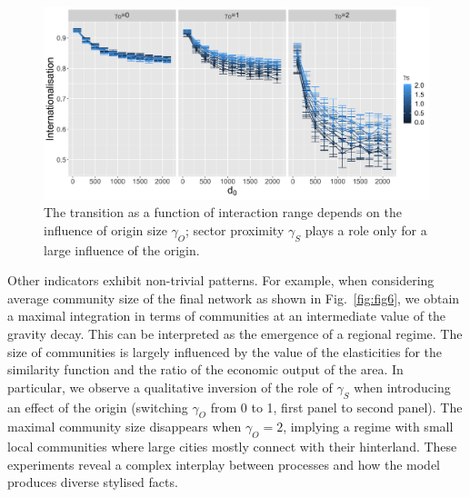 \documentclass[10pt,letterpaper]{article}
\providecommand{\DIFaddbeginFL}{} %
\providecommand{\DIFaddendFL}{} %
\begin{document}
\begin{figure}
    \DIFaddbeginFL \includegraphics[width=\linewidth]{figures/Fig5.png}
    \DIFaddendFL \vspace{2cm}
    \caption{The transition as a function of interaction range depends on the influence of origin size $\gamma_O$; sector proximity $\gamma_S$ plays a role only for a large influence of the origin.\label{fig:fig5}}
\end{figure}


Other indicators exhibit non-trivial patterns. For example, when considering average community size of the final network as shown in Fig.~\ref{fig:fig6}, we obtain a maximal integration in terms of communities at an intermediate value of the gravity decay. This can be interpreted as the emergence of a regional regime. The size of communities is largely influenced by the value of the elasticities for the similarity function and the ratio of the economic output of the area. In particular, we observe a qualitative inversion of the role of $\gamma_S$ when introducing an effect of the origin (switching $\gamma_O$ from 0 to 1, first panel to second panel). The maximal community size disappears when $\gamma_O = 2$, implying a regime with small local communities where large cities mostly connect with their hinterland. These experiments reveal a complex interplay between processes and how the model produces diverse stylised facts.
\end{document}
